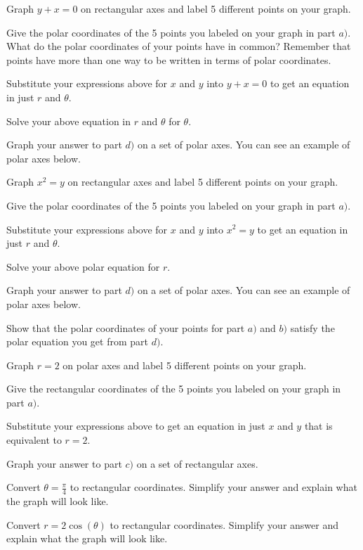 \bq \be
\item Graph $y+x=0$ on rectangular axes and label 5 different points on your graph.
\item Give the polar coordinates of the 5 points you labeled on your graph in part $a)$. What do the polar coordinates of your points have in common? Remember that points have more than one way to be written in terms of polar coordinates.
\item Substitute your expressions above for $x$ and $y$ into $y+x=0$ to get an equation in just $r$ and $\theta$.
\item Solve your above equation in $r$ and $\theta$ for $\theta$.
\item Graph your answer to part $d)$ on a set of polar axes. You can see an example of polar axes below.
\ee
\eq

\bq
\be
\item Graph $x^2=y$ on rectangular axes and label 5 different points on your graph.
\item Give the polar coordinates of the 5 points you labeled on your graph in part $a)$.
\item Substitute your expressions above for $x$ and $y$ into $x^2=y$ to get an equation in just $r$ and $\theta$.
\item Solve your above polar equation for $r$.
\item Graph your answer to part $d)$ on a set of polar axes. You can see an example of polar axes below.
\item Show that the polar coordinates of your points for part $a)$ and $b)$ satisfy the polar equation you get from part $d)$.
\ee
\eq

\bq \be
\item Graph $r=2$ on polar axes and label 5 different points on your graph.
\item Give the rectangular coordinates of the 5 points you labeled on your graph in part $a)$.
\item Substitute your expressions above to get an equation in just $x$ and $y$ that is equivalent to $r=2$.
\item Graph your answer to part $c)$ on a set of rectangular axes.
\ee
\eq

\bq Convert $\theta=\frac{\pi}{4}$ to rectangular coordinates. Simplify your answer and explain what the graph will look like.
\eq

\bq Convert $r=2 \cos(\theta)$ to rectangular coordinates. Simplify your answer and explain what the graph will look like.
\eq

